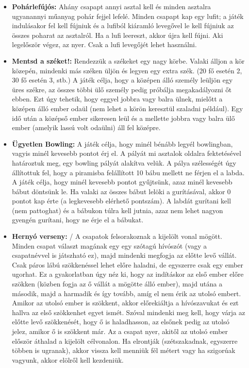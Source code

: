\documentclass[a4paper, 12pt, twoside, openright]{article}
\begin{document}
\begin{itemize}
\item \textbf{Pohárlefújós:} Ahány csapapt annyi asztal kell és minden asztalra ugyanannyi műanyag pohár fejjel lefelé. Minden csapapt kap egy lufit; a játék indulásakor fel kell fújniuk és a lufiból kiáramló levegővel le kell fújniuk az összes poharat az asztalról. Ha a lufi leereszt, akkor újra kell fújni. Aki legelőször végez, az nyer. Csak a lufi levegőjét lehet használni.

\item \textbf{Mentsd a széket!:} Rendezzük a székeket egy nagy körbe. Valaki álljon a kör közepén, mindenki más széken üljön és legyen egy extra szék. (20 fő esetén 2, 30 fő esetén 3, stb.) A játék célja, hogy a középen álló személy leüljön egy üres székre, az összes többi ülő személy pedig próbálja megakadályozni őt ebben. Ezt úgy tehetik, hogy eggyel jobbra vagy balra ülnek, mielőtt a középen álló ember odaül (nem lehet a körön keresztül szaladni például). Egy idő után a középső ember sikeresen leül és a mellette jobbra vagy balra ülő ember (amelyik lassú volt odaülni) áll fel középre.

\item \textbf{Ügyetlen Bowling:} A játék célja, hogy minél bénább legyél bowlingban, vagyis minél kevesebb pontot érj el. A pályát mi asztalok oldalra fektetésével határoztuk meg, egy bowling pályát alakítva velük. A pálya szélességét úgy állítottuk fel, hogy a piramisba felállított 10 bábu mellett ne férjen el a labda. A játék célja, hogy minél kevesebb pontot gyűjtsünk, azaz minél kevesebb bábut döntsünk le. Ha valaki az összes bábut lelöki a gurításával, akkor 0 pontot kap érte (a legkevesebb elérhető pontszám). A labdát gurítani kell (nem pattoghat) és a bábukon túlra kell jutnia, azaz nem lehet nagyon gyengén gurítani, hogy ne érje el a bábukat.

\item \textbf{Hernyó verseny:} / A csapatok felsorakoznak a kijelölt vonal mögött. Minden csapat választ magának egy egy szótagú hívószót (vagy a csapatnévvel is játszható ez), majd mindenki megfogja az előtte levő vállát. Csak páros lábú szökkenéssel lehet előre haladni, de egyszerre csak egy ember ugorhat. Ez a gyakorlatban úgy néz ki, hogy az indításkor az első ember előre szökken (közben fogja az ő vállát a mögötte álló ember), majd utána a második, majd a harmadik és így tovább, amíg el nem érik az utolsó embert. Amikor az utolsó ember is szökkent, akkor előrekiáltja a hívószavukat és ezt hallva az első szökkenhet egyet ismét. Szóval mindenki meg kell, hogy várja az előtte levő szökkenését, hogy ő is haladhasson, az elsőnek pedig az utolsó jelez, amikor ő is szökkent már. Az a csapat nyer, akitől az utolsó ember először áthalad a kijelölt célvonalon. Ha elrontják (szétszakadnak, egyszerre többen is ugranak), akkor vissza kell menniük fél métert vagy ha szigorúak vagyunk, akkor elölről kell kezdeniük.


\end{itemize}
\end{document}
